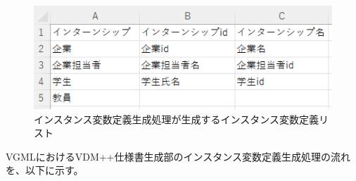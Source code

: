 \begin{figure}[t]
    \begin{center}
        \includegraphics[width=1.0\columnwidth]{image/instance_list.png}
        \caption{インスタンス変数定義生成処理が生成するインスタンス変数定義リスト}
        \label{fig:instance_list}
    \end{center}
\end{figure}

VGMLにおけるVDM++仕様書生成部のインスタンス変数定義生成処理の流れを、以下に示す。

